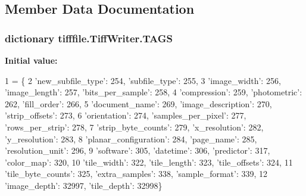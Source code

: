 \subsection{Member Data Documentation}
\hypertarget{classtifffile_1_1TiffWriter_a59306b1d4123917f8ef19b622932be69}{
\subsubsection[{T\-A\-G\-S}]{\setlength{\rightskip}{0pt plus 5cm}dictionary tifffile.\-Tiff\-Writer.\-T\-A\-G\-S\hspace{0.3cm}{\ttfamily [static]}}}\label{classtifffile_1_1TiffWriter_a59306b1d4123917f8ef19b622932be69}
{\bfseries Initial value\-:}
\begin{DoxyCode}
1 = \{
2         \textcolor{stringliteral}{'new\_subfile\_type'}: 254, \textcolor{stringliteral}{'subfile\_type'}: 255,
3         \textcolor{stringliteral}{'image\_width'}: 256, \textcolor{stringliteral}{'image\_length'}: 257, \textcolor{stringliteral}{'bits\_per\_sample'}: 258,
4         \textcolor{stringliteral}{'compression'}: 259, \textcolor{stringliteral}{'photometric'}: 262, \textcolor{stringliteral}{'fill\_order'}: 266,
5         \textcolor{stringliteral}{'document\_name'}: 269, \textcolor{stringliteral}{'image\_description'}: 270, \textcolor{stringliteral}{'strip\_offsets'}: 273,
6         \textcolor{stringliteral}{'orientation'}: 274, \textcolor{stringliteral}{'samples\_per\_pixel'}: 277, \textcolor{stringliteral}{'rows\_per\_strip'}: 278,
7         \textcolor{stringliteral}{'strip\_byte\_counts'}: 279, \textcolor{stringliteral}{'x\_resolution'}: 282, \textcolor{stringliteral}{'y\_resolution'}: 283,
8         \textcolor{stringliteral}{'planar\_configuration'}: 284, \textcolor{stringliteral}{'page\_name'}: 285, \textcolor{stringliteral}{'resolution\_unit'}: 296,
9         \textcolor{stringliteral}{'software'}: 305, \textcolor{stringliteral}{'datetime'}: 306, \textcolor{stringliteral}{'predictor'}: 317, \textcolor{stringliteral}{'color\_map'}: 320,
10         \textcolor{stringliteral}{'tile\_width'}: 322, \textcolor{stringliteral}{'tile\_length'}: 323, \textcolor{stringliteral}{'tile\_offsets'}: 324,
11         \textcolor{stringliteral}{'tile\_byte\_counts'}: 325, \textcolor{stringliteral}{'extra\_samples'}: 338, \textcolor{stringliteral}{'sample\_format'}: 339,
12         \textcolor{stringliteral}{'image\_depth'}: 32997, \textcolor{stringliteral}{'tile\_depth'}: 32998\}
\end{DoxyCode}
